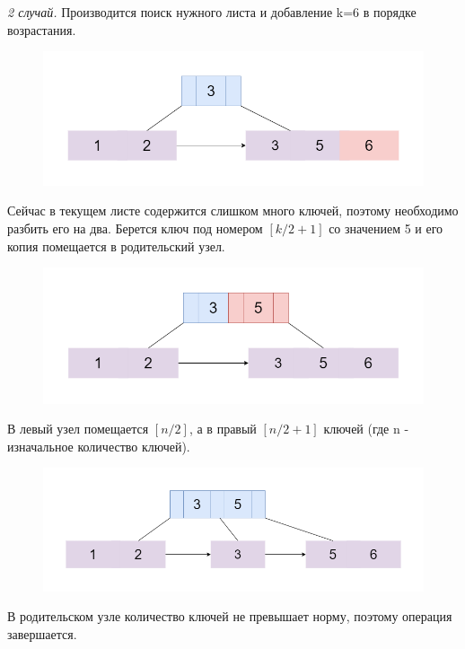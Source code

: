 \documentclass{article}
\begin{document}
\textit{2 случай.} Производится поиск нужного листа и добавление k=6 в порядке возрастания.
\begin{figure}
\includegraphics[scale=0.4]{binsert21.png}

\caption{}
\end{figure}


Сейчас в текущем листе содержится слишком много ключей, поэтому необходимо разбить его на два. Берется ключ под номером $[k/2+1]$ со значением 5 и его копия помещается в родительский узел.
\begin{figure}
\includegraphics[scale=0.4]{binsert22 (1).png}

\caption{}
\end{figure}


В левый узел помещается $[n/2]$, а в правый $[n/2+1]$ ключей (где n - изначальное количество ключей).
\begin{figure}
\includegraphics[scale=0.4]{binsert23 (1).png}

\caption{}
\end{figure}


В родительском узле количество ключей не превышает норму, поэтому операция завершается.
\end{document}

